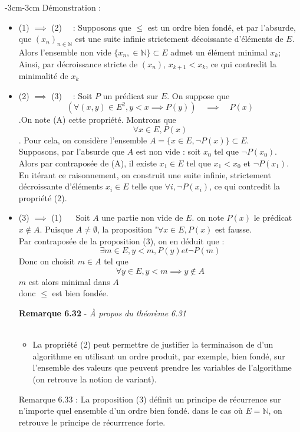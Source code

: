 \documentclass{article}
\newenvironment{remarque}[2]
{
    \begin{boite_remarque}
    \textbf{\textcolor{bleu_fonce}{Remarque #1}} - \textit{#2} \\ \\
    \begin{itemize}[label=$\blacktriangleright \quad $ ]                    
}
{   
    \end{itemize}
    \end{boite_remarque}
    
}
\begin{document}
\begin{adjustwidth}{-3cm}{-3cm}
    Démonstration :
    \begin{itemize}
        \item (1) $\implies$ (2) $\quad$: Supposons que $\leq$ est un ordre bien fondé, et par l'absurde, que $(x_n)_{n \in \mathbb{N}}$ est une suite infinie strictement décoissante d'éléments de $E$. Alors l'ensemble non vide $\{x_n, \in \mathbb{N}\} \subset E$ admet un élément minimal $x_k$; Ainsi, par décroissance stricte de $(x_n)$, $x_{k+1} < x_k$, ce qui contredit la minimalité de $x_k$
        \item (2) $\implies$ (3) $\quad$: Soit $P$ un prédicat sur $E$. On suppose que $$(\forall (x,y) \in E^2, y < x \implies P(y)) \quad \implies \quad P(x) $$.On note (A) cette propriété. Montrons que $$ \forall x \in E, P(x)$$. Pour cela, on considère l'ensemble $A = \{x \in E, \lnot P(x)\} \subset E$. \\ Supposons, par l'absurde que $A$ est non vide : soit $x_0$ tel que $\lnot P(x_0)$. \\ Alors par contraposée de (A), il existe $x_1 \in E$ tel que $x_1 < x_0$ et $\lnot P(x_1)$. \\En itérant ce raisonnement, on construit une suite infinie, strictement décroissante d'éléments $x_i \in E$ telle que $\forall i, \lnot P(x_i)$, ce qui contredit la propriété (2).
        \item (3) $\implies$ (1) $\quad$ Soit $A$ une partie non vide de $E$. on note $P(x)$ le prédicat $x \notin A$. Puisque $A \neq \emptyset$, la proposition "$\forall x \in E, P(x) $ est fausse. \\ Par contraposée de la proposition (3), on en déduit que : $$\exists m \in E, y<m, P(y) et \lnot P(m)$$ Donc on choisit $m \in A $ tel que $$\forall y \in E, y<m \implies y \notin A$$ $m$ est alors minimal dans $A$ \\ donc $\leq$ est bien fondée.
        
        
        \begin{remarque}{6.32}{À propos du théorème 6.31}
            \item La propriété (2) peut permettre de justifier la terminaison de d'un algorithme en utilisant un ordre produit, par exemple, bien fondé, sur l'ensemble des valeurs que peuvent prendre les variables de l'algorithme (on retrouve la notion de variant).
        \end{remarque}

        Remarque 6.33 : 
        La proposition (3) définit un principe de récurrence sur n'importe quel ensemble d'un ordre bien fondé. dans le cas où $E = \mathbb{N}$, on retrouve le principe de récurrrence forte.


\end{itemize}
\end{adjustwidth}
\end{document}

